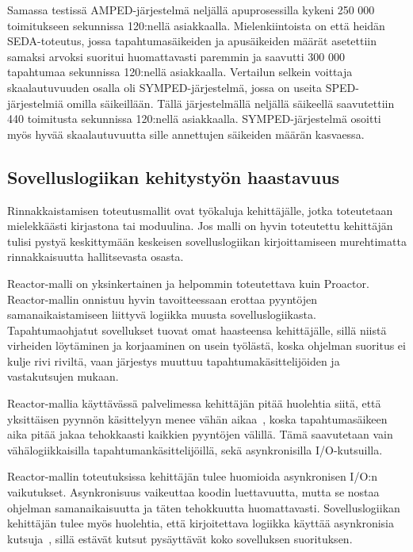 \documentclass[finnish]{tktltiki2}
\theoremstyle{definition}
\theoremstyle{remark}
\begin{document}
Samassa testissä AMPED-järjestelmä neljällä apuprosessilla
kykeni 250 000 toimitukseen sekunnissa 120:nellä asiakkaalla. Mielenkiintoista on
että heidän SEDA-toteutus, jossa tapahtumasäikeiden ja apusäikeiden
määrät asetettiin samaksi arvoksi suoritui huomattavasti paremmin ja
saavutti 300 000 tapahtumaa sekunnissa 120:nellä asiakkaalla.
Vertailun selkein voittaja skaalautuvuuden
osalla oli SYMPED-järjestelmä, jossa on useita SPED-järjestelmiä
omilla säikeillään. Tällä järjestelmällä neljällä säikeellä
saavutettiin 440 toimitusta sekunnissa 120:nellä asiakkaalla.
SYMPED-järjestelmä osoitti myös hyvää skaalautuvuutta
sille annettujen säikeiden määrän kasvaessa.


\subsection{Sovelluslogiikan kehitystyön haastavuus}
Rinnakkaistamisen toteutusmallit ovat työkaluja kehittäjälle,
jotka toteutetaan mielekkäästi kirjastona tai moduulina.
Jos malli on hyvin toteutettu kehittäjän tulisi pystyä
keskittymään keskeisen sovelluslogiikan kirjoittamiseen
murehtimatta rinnakkaisuutta hallitsevasta osasta.

Reactor-malli on yksinkertainen ja helpommin toteutettava
kuin Proactor. Reactor-mallin onnistuu hyvin tavoitteessaan
erottaa pyyntöjen samanaikaistamiseen liittyvä logiikka
muusta sovelluslogiikasta.
Tapahtumaohjatut sovellukset tuovat omat haasteensa
kehittäjälle, sillä niistä virheiden löytäminen ja
korjaaminen on usein työlästä, koska ohjelman
suoritus ei kulje rivi riviltä, vaan järjestys
muuttuu tapahtumakäsittelijöiden ja vastakutsujen mukaan.

Reactor-mallia käyttävässä palvelimessa kehittäjän
pitää huolehtia siitä, että yksittäisen pyynnön
käsittelyyn menee vähän aikaa~\cite{pyarali_proactor_1997}, koska
tapahtumasäikeen aika pitää jakaa tehokkaasti
kaikkien pyyntöjen välillä. Tämä saavutetaan
vain vähälogiikkaisilla tapahtumankäsittelijöillä, sekä
asynkronisilla I/O-kutsuilla.

Reactor-mallin toteutuksissa kehittäjän tulee huomioida
asynkronisen I/O:n vaikutukset. Asynkronisuus vaikeuttaa koodin
luettavuutta, mutta se nostaa ohjelman samanaikaisuutta ja täten
tehokkuutta huomattavasti. Sovelluslogiikan kehittäjän
tulee myös huolehtia, että kirjoitettava logiikka
käyttää asynkronisia kutsuja~\cite{pyarali_proactor_1997}, sillä estävät
kutsut pysäyttävät koko sovelluksen suorituksen.
\end{document}
